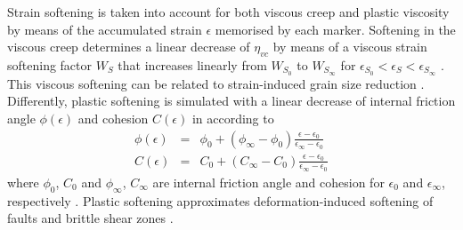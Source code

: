 \documentclass[hidelinks,10pt,a4paper]{article}
\begin{document}
Strain softening is taken into account for both viscous creep and plastic viscosity \citep{Huismans2003,Babeyko2005,Huismans2005,Sobolev2005,Warren2008a} by
means of the accumulated strain $\epsilon$ memorised by each marker. Softening in the viscous creep determines a linear decrease of $\eta_{vc}$ by means of a
viscous strain softening factor $W_S$ that increases linearly from $W_{S_0}$ to $W_{S_{\infty}}$ for $\epsilon_{S_0}<\epsilon_S<\epsilon_{S_{\infty}}$ 
\citep{Warren2008a}. This viscous softening can be related to strain-induced grain size reduction \citep{Warren2008a}. Differently, plastic softening is 
simulated with a linear decrease of internal friction angle $\phi(\epsilon)$ and cohesion $C(\epsilon)$ in according to
\begin{eqnarray}
\label{eq:friction1}\phi(\epsilon)&=&\phi_0+(\phi_{\infty}-\phi_0)\frac{\epsilon-\epsilon_0}{\epsilon_{\infty}-\epsilon_0}\\
\label{eq:friction2}C(\epsilon)&=&C_0+(C_{\infty}-C_0)\frac{\epsilon-\epsilon_0}{\epsilon_{\infty}-\epsilon_0}
\end{eqnarray}
where $\phi_0$, $C_0$ and $\phi_{\infty}$, $C_{\infty}$ are internal friction angle and cohesion for $\epsilon_0$ and $\epsilon_{\infty}$, respectively
\citep{Huismans2003,Huismans2005,Warren2008a,Thieulot2014}. Plastic softening approximates deformation-induced softening of faults and brittle shear zones
\citep{Warren2008a}.
\end{document}
